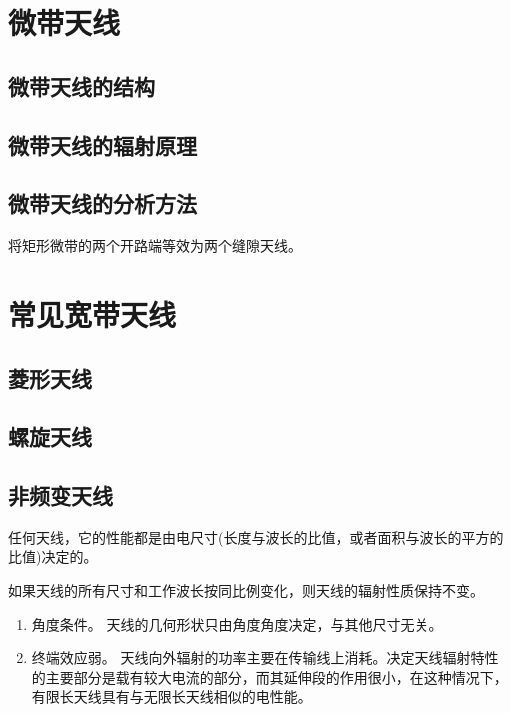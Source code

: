 \section{微带天线}

    \subsection{微带天线的结构}

    \subsection{微带天线的辐射原理}

    \subsection{微带天线的分析方法}
    将矩形微带的两个开路端等效为两个缝隙天线。


\section{常见宽带天线}

    \subsection{菱形天线}    
    
    \subsection{螺旋天线}
        
    \subsection{非频变天线}
    任何天线，它的性能都是由电尺寸(长度与波长的比值，或者面积与波长的平方的比值)决定的。

    如果天线的所有尺寸和工作波长按同比例变化，则天线的辐射性质保持不变。

    \begin{enumerate}
    \renewcommand*\labelenumi{\circled{\theenumi}}
        \item 角度条件。 天线的几何形状只由角度角度决定，与其他尺寸无关。
        \item 终端效应弱。 天线向外辐射的功率主要在传输线上消耗。决定天线辐射特性的主要部分是载有较大电流的部分，而其延伸段的作用很小，在这种情况下，有限长天线具有与无限长天线相似的电性能。
    \end{enumerate}

